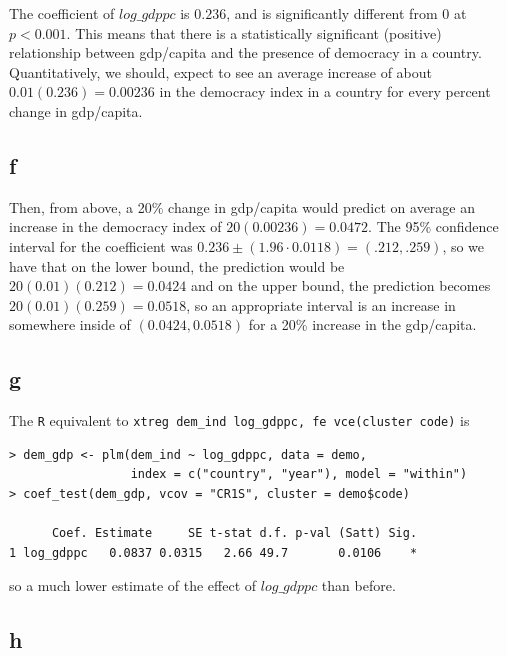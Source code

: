 \documentclass[12pt,letterpaper]{article}
\theoremstyle{definition}
\begin{document}
The coefficient of $log\_gdppc$ is $0.236$, and is significantly different from 0 at $p < 0.001$. This means that there is a statistically significant (positive) relationship between gdp/capita and the presence of democracy in a country. Quantitatively, we should, expect to see an average increase of about $0.01(0.236) = 0.00236$ in the democracy index in a country for every percent change in gdp/capita.

\subsection*{f}

Then, from above, a 20\% change in gdp/capita would predict on average an increase in the democracy index of $20(0.00236) = 0.0472 $. The 95\% confidence interval for the coefficient was $0.236 \pm (1.96 \cdot 0.0118) = (.212, .259)$, so we have that on the lower bound, the prediction would be $20(0.01)(0.212) = 0.0424$ and on the upper bound, the prediction becomes $20(0.01)(0.259) = 0.0518$, so an appropriate interval is an increase in somewhere inside of $(0.0424, 0.0518)$ for a 20\% increase in the gdp/capita.

\subsection*{g}

The \verb|R| equivalent to \verb|xtreg dem_ind log_gdppc, fe vce(cluster code)| is
\begin{Verbatim}[fontsize=\small]
> dem_gdp <- plm(dem_ind ~ log_gdppc, data = demo,
                 index = c("country", "year"), model = "within")
> coef_test(dem_gdp, vcov = "CR1S", cluster = demo$code)

      Coef. Estimate     SE t-stat d.f. p-val (Satt) Sig.
1 log_gdppc   0.0837 0.0315   2.66 49.7       0.0106    *
\end{Verbatim}
so a much lower estimate of the effect of $log\_gdppc$ than before.

\subsection*{h}
\end{document}
